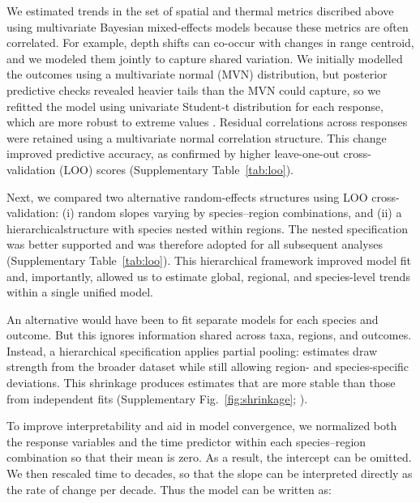 \documentclass[11pt]{article}
\begin{document}
\begin{spacing}{1.5}
We estimated trends in the set of spatial and thermal metrics discribed above using multivariate Bayesian mixed-effects models because these metrics are often correlated. For example, depth shifts can co-occur with changes in range centroid, and we modeled them jointly to capture shared variation. We initially modelled the outcomes using a multivariate normal (MVN) distribution, but posterior predictive checks revealed heavier tails than the MVN could capture, so we refitted the model using univariate Student-t distribution for each response, which are more robust to extreme values \citep[e.g.,][]{anderson_black-swan_2017}. Residual correlations across responses were retained using a multivariate normal correlation structure. This change improved predictive accuracy, as confirmed by higher leave-one-out cross-validation (LOO) scores \citep{vehtari_practical_2017} (Supplementary Table~\ref{tab:loo}).

Next, we compared two alternative random-effects structures using LOO cross-validation: (i) random slopes varying by species–region combinations, and (ii) a hierarchicalstructure with species nested within regions. The nested specification was better supported and was therefore adopted for all subsequent analyses (Supplementary Table~\ref{tab:loo}). This hierarchical framework improved model fit and, importantly, allowed us to estimate global, regional, and species-level trends within a single unified model.

An alternative would have been to fit separate models for each species and outcome. But this ignores information shared across taxa, regions, and outcomes. Instead, a hierarchical specification applies partial pooling: estimates draw strength from the broader dataset while still allowing region- and species-specific deviations. This shrinkage produces estimates that are more stable than those from independent fits (Supplementary Fig.~\ref{fig:shrinkage}; \citealt{mcelreath_statistical_2018}).


To improve interpretability and aid in model convergence, we normalized both the response variables and the time predictor within each species–region combination so that their mean is zero. As a result, the intercept can be omitted. We then rescaled time to decades, so that the slope can be interpreted directly as the rate of change per decade.
Thus the model can be written as:


\end{spacing}
\end{document}
